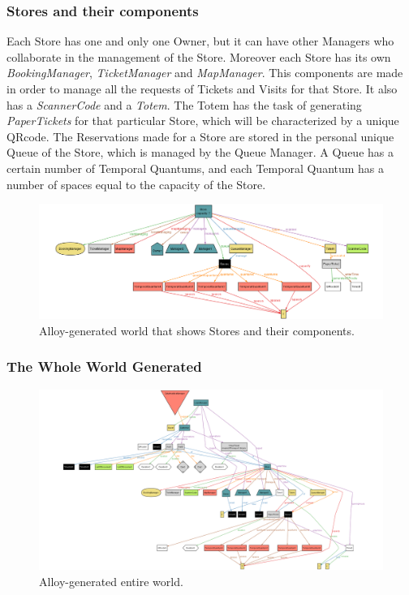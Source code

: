 \documentclass[a4paper, 12pt, oneside]{article}
\begin{document}
\subsubsection{Stores and their components}
Each Store has one and only one Owner, but it can have other Managers who collaborate in the management of the Store. Moreover each Store has its own \textit{BookingManager}, \textit{TicketManager} and \textit{MapManager}. This components are made in order to manage all the requests of Tickets and Visits for that Store. It also has a \textit{ScannerCode} and a \textit{Totem}. The Totem has the task of generating \textit{PaperTickets} for that particular Store, which will be characterized by a unique QRcode. The Reservations made for a Store are stored in the personal unique Queue of the Store, which is managed by the Queue Manager. A Queue has a certain number of Temporal Quantums, and each Temporal Quantum has a number of spaces equal to the capacity of the Store.
\begin{figure}[h!]
\centering
	\centering
  	\includegraphics[height=0.23\textheight, scale=0.3, keepaspectratio]{img/alloy/alloy_store.png}
	\caption{Alloy-generated world that shows Stores and their components.}
 	\label{alloy_stores}
\end{figure}

\subsubsection{The Whole World Generated}
\begin{figure}[h!]
\centering
	\centering
  	\includegraphics[height=0.35\textheight, scale=0.3, keepaspectratio]{img/alloy/alloy_entire_world.png}
	\caption{Alloy-generated entire world.}
 	\label{alloy_entire_world}
\end{figure}
\end{document}
